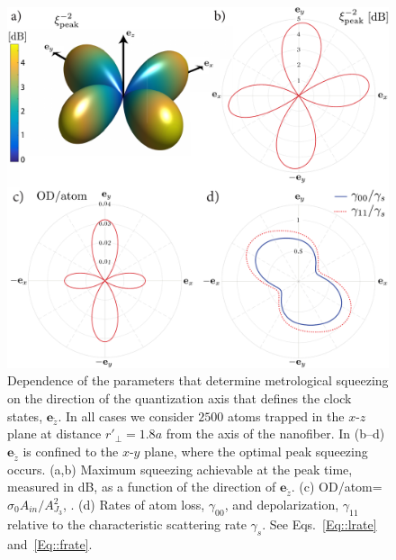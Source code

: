 \documentclass[aps,pra,twocolumn]{revtex4-1} %
\newcommand{\qaxis}{\mathbf{e}_{\tilde{z}}}
\begin{document}
\begin{figure}
\includegraphics[scale=0.37]{./Figs/Fig_SqueezingQuantAxis}
\caption{Dependence of the parameters that determine metrological squeezing  on {\color{blue} the direction of the quantization axis that defines the clock states, $\qaxis$.  In all cases we consider $2500$ atoms trapped in the $x$-$z$ plane at distance $ r'\!_\perp=1.8a$ from the axis of the nanofiber. 
In (b--d) $\qaxis$ is confined to the $x$-$y$ plane, where the optimal peak squeezing occurs.
(a,b)  Maximum squeezing achievable at the peak time, measured in dB, as a function of the direction of  $\qaxis$. 
(c) OD/atom=$\sigma_0 A_{in}/A^2_{J_3}$, .
(d) Rates of atom loss, $\gamma_{00}$, and depolarization, $\gamma_{11}$ relative to the characteristic scattering rate $\gamma_s$.  See Eqs.~\eqref{Eq::lrate} and~\eqref{Eq::frate}.} }\label{Fig::Squeezing_QuantizationAxis}
\end{figure}
\end{document}
